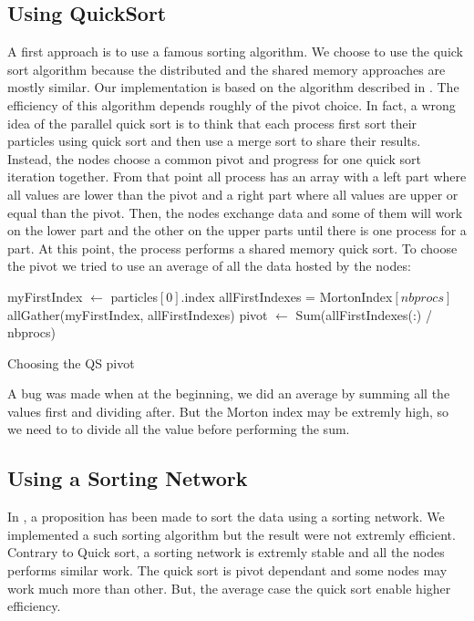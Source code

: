 \documentclass[12pt,letterpaper,titlepage]{report}
\begin{document}
\subsection{Using QuickSort}
A first approach is to use a famous sorting algorithm.
We choose to use the quick sort algorithm because the distributed and the shared memory approaches are mostly similar.
Our implementation is based on the algorithm described in \cite{itpc03}.
The efficiency of this algorithm depends roughly of the pivot choice.
In fact, a wrong idea of the parallel quick sort is to think that each process first sort their particles using quick sort and then use a merge sort to share their results.
Instead, the nodes choose a common pivot and progress for one quick sort iteration together.
From that point all process has an array with a left part where all values are lower than the pivot and a right part where all values are upper or equal than the pivot.
Then, the nodes exchange data and some of them will work on the lower part and the other on the upper parts until there is one process for a part.
At this point, the process performs a shared memory quick sort.
To choose the pivot we tried to use an average of all the data hosted by the nodes:
\newline
\begin{algorithm}[H]
\linesnumbered
\SetLine
{}
\BlankLine
myFirstIndex $\leftarrow$ particles$[0]$.index\;
allFirstIndexes = MortonIndex$[nbprocs]$\;
allGather(myFirstIndex, allFirstIndexes)\;
pivot $\leftarrow$ Sum(allFirstIndexes(:) / nbprocs)\;
\BlankLine
\caption{Choosing the QS pivot}
\end{algorithm}
\newline
A bug was made when at the beginning, we did an average by summing all the values first and dividing after. But the Morton index may be extremly high, so we need to to divide all the value before performing the sum.

\subsection{Using a Sorting Network}
In \cite{ptttplwaefmm11}, a proposition has been made to sort the data using a sorting network.
We implemented a such sorting algorithm but the result were not extremly efficient.
Contrary to Quick sort, a sorting network is extremly stable and all the nodes performs similar work.
The quick sort is pivot dependant and some nodes may work much more than other.
But, the average case the quick sort enable higher efficiency.
\end{document}
